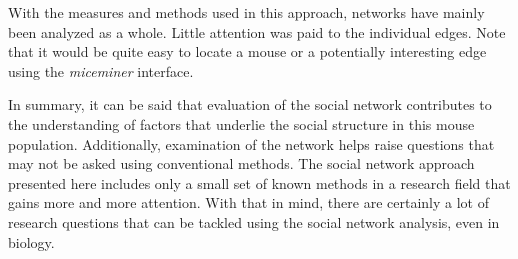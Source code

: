 With the measures and methods used in this approach, networks have mainly been analyzed as a whole. Little attention was paid to the individual edges. Note that it would be quite easy to locate a mouse or a potentially interesting edge using the \textit{miceminer} interface.

In summary, it can be said that evaluation of the social network contributes to the understanding of factors that underlie the social structure in this mouse population. Additionally, examination of the network helps raise questions that may not be asked using conventional methods. The social network approach presented here includes only a small set of known methods in a research field that gains more and more attention. With that in mind, there are certainly a lot of research questions that can be tackled using the social network analysis, even in biology.